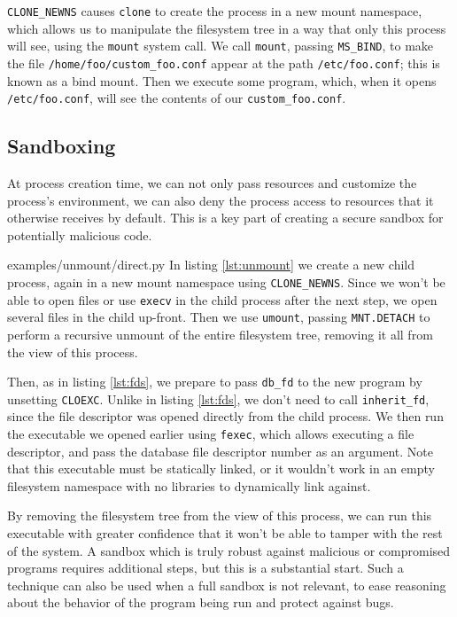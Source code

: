 \documentclass[letterpaper,twocolumn,10pt]{article}
\begin{document}
\verb|CLONE_NEWNS| causes \texttt{clone} to create the process in a new mount namespace,
which allows us to manipulate the filesystem tree in a way that only this process will see,
using the \texttt{mount} system call\cite{mount_namespaces}\cite{clone}.
We call \texttt{mount}, passing \texttt{MS\_BIND}, to make the file \verb|/home/foo/custom_foo.conf|
appear at the path \verb|/etc/foo.conf|;
this is known as a bind mount\cite{mount}.
Then we execute some program,
which, when it opens \verb|/etc/foo.conf|, will see the contents of our \verb|custom_foo.conf|.
\subsection{Sandboxing}
At process creation time,
we can not only pass resources and customize the process's environment,
we can also deny the process access to resources that it otherwise receives by default.
This is a key part of creating a secure sandbox for potentially malicious code\cite{seccomp}\cite{firejail}\cite{gvisor}.


{examples/unmount/direct.py}
In listing \ref{lst:unmount}
we create a new child process,
again in a new mount namespace using \verb|CLONE_NEWNS|.
Since we won't be able to open files or use \texttt{execv} in the child process after the next step,
we open several files in the child up-front.
Then we use \texttt{umount},
passing \texttt{MNT.DETACH} to perform a recursive unmount of the entire filesystem tree,
removing it all from the view of this process.

Then, as in listing \ref{lst:fds}, we prepare to pass \texttt{db\_fd} to the new program by unsetting \texttt{CLOEXC}.
Unlike in listing \ref{lst:fds}, we don't need to call \verb|inherit_fd|,
since the file descriptor was opened directly from the child process.
We then run the executable we opened earlier using \texttt{fexec},
which allows executing a file descriptor,
and pass the database file descriptor number as an argument\cite{execveat}.
Note that this executable must be statically linked,
or it wouldn't work in an empty filesystem namespace
with no libraries to dynamically link against.

By removing the filesystem tree from the view of this process,
we can run this executable with greater confidence
that it won't be able to tamper with the rest of the system.
A sandbox which is truly robust against malicious or compromised programs requires additional steps,
but this is a substantial start\cite{firejail}\cite{gvisor}.
Such a technique can also be used when a full sandbox is not relevant,
to ease reasoning about the behavior of the program being run
and protect against bugs.
\end{document}
